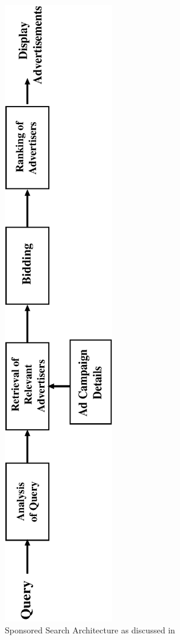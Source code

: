\begin{figure}
	\centering
\includegraphics[scale=0.55,angle = 270]{visuals/present.eps}
	\caption{Sponsored Search Architecture as discussed in \cite{mehta2007adwords}}
	\label{fig:adwords:architecture}
\end{figure}


